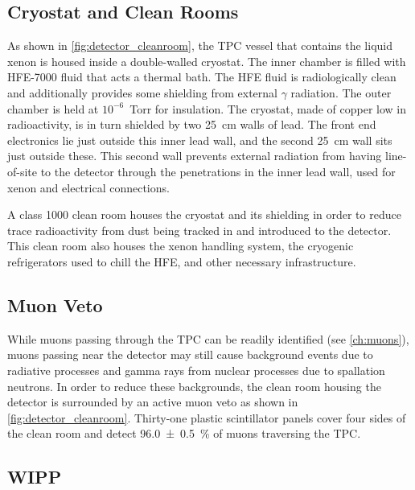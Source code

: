 \documentclass[herrin-thesis.tex]{subfiles}
\begin{document}
\subsection{Cryostat and Clean Rooms}
As shown in \cref{fig:detector_cleanroom}, the TPC vessel that contains the liquid xenon is housed inside a double-walled cryostat. The inner chamber is filled with HFE-7000\cite{hfe7000} fluid that acts a thermal bath. The HFE fluid is radiologically clean and additionally provides some shielding from external \(\gamma\) radiation. The outer chamber is held at \(10^{-6}\)~\si{Torr} for insulation. The cryostat, made of copper low in radioactivity, is in turn shielded by two \SI{25}{\cm} walls of lead. The front end electronics lie just outside this inner lead wall, and the second \SI{25}{\cm} wall sits just outside these. This second wall prevents external radiation from having line-of-site to the detector through the penetrations in the inner lead wall, used for xenon and electrical connections.

A class 1000 clean room houses the cryostat and its shielding in order to reduce trace radioactivity from dust being tracked in and introduced to the detector. This clean room also houses the xenon handling system, the cryogenic refrigerators used to chill the HFE, and other necessary infrastructure.

\subsection{Muon Veto}
While muons passing through the TPC can be readily identified (see \cref{ch:muons}), muons passing near the detector may still cause background events due to radiative processes and gamma rays from nuclear processes due to spallation neutrons. In order to reduce these backgrounds, the clean room housing the detector is surrounded by an active muon veto as shown in \cref{fig:detector_cleanroom}. Thirty-one plastic scintillator panels cover four sides of the clean room and detect \SI{96.0\pm0.5}{\%} of muons traversing the TPC.

\subsection{WIPP}
\end{document}
